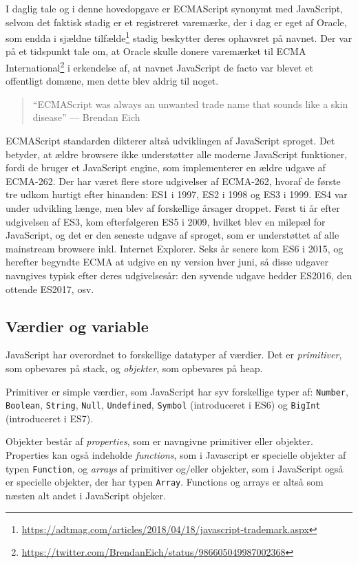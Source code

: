 \documentclass[]{article}
\begin{document}
I daglig tale og i denne hovedopgave er ECMAScript synonymt med
JavaScript, selvom det faktisk stadig er et registreret varemærke, der i
dag er eget af Oracle, som endda i sjældne tilfælde\footnote{\url{https://adtmag.com/articles/2018/04/18/javascript-trademark.aspx}}
stadig beskytter deres ophavsret på navnet. Der var på et tidspunkt tale
om, at Oracle skulle donere varemærket til ECMA International\footnote{\url{https://twitter.com/BrendanEich/status/986605049987002368}}
i erkendelse af, at navnet JavaScript de facto var blevet et offentligt
domæne, men dette blev aldrig til noget.

\begin{quote}
``ECMAScript was always an unwanted trade name that sounds like a skin
disease'' --- Brendan Eich
\end{quote}

ECMAScript standarden dikterer altså udviklingen af JavaScript sproget.
Det betyder, at ældre browsere ikke understøtter alle moderne JavaScript
funktioner, fordi de bruger et JavaScript engine, som implementerer en
ældre udgave af ECMA-262. Der har været flere store udgivelser af
ECMA-262, hvoraf de første tre udkom hurtigt efter hinanden: ES1 i 1997,
ES2 i 1998 og ES3 i 1999. ES4 var under udvikling længe, men blev af
forskellige årsager droppet. Først ti år efter udgivelsen af ES3, kom
efterfølgeren ES5 i 2009, hvilket blev en milepæl for JavaScript, og det
er den seneste udgave af sproget, som er understøttet af alle mainstream
browsere inkl. Internet Explorer. Seks år senere kom ES6 i 2015, og
herefter begyndte ECMA at udgive en ny version hver juni, så disse
udgaver navngives typisk efter deres udgivelsesår: den syvende udgave
hedder ES2016, den ottende ES2017, osv.

\hypertarget{vuxe6rdier-og-variable}{%
\subsection{Værdier og variable}\label{vuxe6rdier-og-variable}}

JavaScript har overordnet to forskellige datatyper af værdier. Det er
\emph{primitiver}, som opbevares på stack, og \emph{objekter}, som
opbevares på heap.

Primitiver er simple værdier, som JavaScript har syv forskellige typer
af: \texttt{Number}, \texttt{Boolean}, \texttt{String}, \texttt{Null},
\texttt{Undefined}, \texttt{Symbol} (introduceret i ES6) og
\texttt{BigInt} (introduceret i ES7).

Objekter består af \emph{properties}, som er navngivne primitiver eller
objekter. Properties kan også indeholde \emph{functions}, som i
Javascript er specielle objekter af typen \texttt{Function}, og
\emph{arrays} af primitiver og/eller objekter, som i JavaScript også er
specielle objekter, der har typen \texttt{Array}. Functions og arrays er
altså som næsten alt andet i JavaScript objeker.
\end{document}
